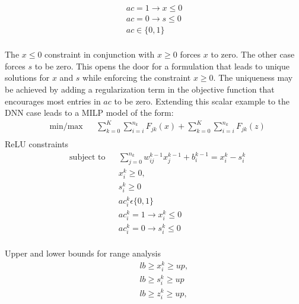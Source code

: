 \begin{equation}
\label{6}
\begin{aligned}
ac =  1 \rightarrow x \leq 0  \\
ac =  0 \rightarrow s \leq 0  \\
ac \in \{0,1\} \\
\end{aligned}
\end{equation}

The $x \leq 0$ constraint in conjunction with $x \geq 0$ forces $x$ to zero. The other case forces $s$ to be zero.
This opens the door for a formulation that leads to unique solutions for $x$ and $s$ while enforcing the constraint $x \geq 0$.
The uniqueness may be achieved by adding a regularization term in the objective function that encourages most entries in $ac$ to be zero.
Extending this scalar example to the DNN case leads to a \ac{MILP} model of the form:
\begin{equation}
\label{7}
\begin{aligned}
& \underset{}{\text{min/max}}
& &  \sum_{k=0}^{K} \sum_{i=i}^{n_k}F_{jk}(x)   + \sum_{k=0}^{K} \sum_{i=i}^{n_k}F_{jk}(z)  \\
\end{aligned}
\end{equation}
ReLU constraints
\begin{equation}
\label{8}
\begin{aligned}
& \text{subject to} & &  \sum_{j=0}^{n_k} w_{ij}^{k-1}x_{j}^{k-1} + b_i^{k-1} = x_i^k - s_i^k  \\
& & & x_i^k \geq 0, \\
& & & s_i^k \geq 0 \\
& & & ac_i^k  \epsilon  \{0,1\} \\
& & & ac_i^k  =  1 \rightarrow  x_i^k \leq 0  \\
& & & ac_i^k =  0 \rightarrow s_i^k  \leq 0   \\
\end{aligned}
\end{equation}

Upper and lower bounds for range analysis
\begin{equation}
\label{9}
\begin{aligned}
& & & lb \geq x_i^k \geq up, \\
& & &  lb \geq s_i^k \geq up \\
& & & lb \geq z_i^k \geq up, \\
\end{aligned}
\end{equation}


